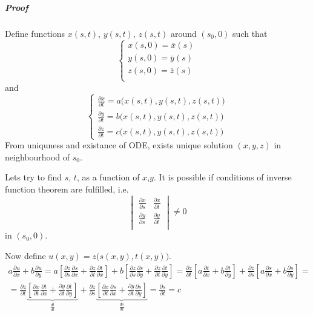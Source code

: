 \subparagraph{Proof}
Define functions $x(s,t)$, $y(s,t)$, $z(s,t)$ around $(s_0,0)$  such that
$$\begin{cases}
x(s,0) = \bar{x}(s)\\
y(s,0) = \bar{y}(s)\\
z(s,0) = \bar{z}(s)\\
\end{cases}$$
and
$$\begin{cases}
\frac{\partial x}{\partial t} = a\big(x(s,t), y(s,t), z(s,t)\big)\\
\frac{\partial y}{\partial t} = b\big(x(s,t), y(s,t), z(s,t)\big)\\
\frac{\partial z}{\partial t} = c\big(x(s,t), y(s,t), z(s,t)\big)
\end{cases}$$
From uniquness and existance of ODE, exists unique solution $(x,y,z)$ in neighbourhood of $s_0$.

Lets try to find $s$, $t$, as a function of $x$,$y$. It is possible if conditions of inverse function theorem are fulfilled, i.e.\
$$\begin{vmatrix}
\frac{\partial x}{\partial s}&\frac{\partial x}{\partial t}\\
\frac{\partial y}{\partial s}&\frac{\partial y}{\partial t}\\
\end{vmatrix}\neq 0$$
in $(s_0,0)$.

Now define $u(x,y) = z\big(s(x,y), t(x,y)\big)$.
\begin{align*}
a\frac{\partial u}{\partial x}+b\frac{\partial u}{\partial y} = a\left[\frac{\partial z}{\partial s}\frac{\partial s}{\partial x}+\frac{\partial z}{\partial t}\frac{\partial t}{\partial x}\right]+b\left[\frac{\partial z}{\partial s}\frac{\partial s}{\partial y}+\frac{\partial z}{\partial t}\frac{\partial t}{\partial y}\right] = \frac{\partial z}{\partial t} \left[a\frac{\partial t}{\partial x} + b\frac{\partial t}{\partial y}\right] + \frac{\partial z}{\partial s} \left[a\frac{\partial s}{\partial x} + b\frac{\partial s}{\partial y}\right] =\\= \frac{\partial z}{\partial t} \underbrace{\left[\frac{\partial x}{\partial t}\frac{\partial t}{\partial x} + \frac{\partial y}{\partial t}\frac{\partial t}{\partial y}\right]}_{\frac{dt}{dt}} + \frac{\partial z}{\partial s} \underbrace{ \left[\frac{\partial x}{\partial t}\frac{\partial s}{\partial x} + \frac{\partial y}{\partial t}\frac{\partial s}{\partial y}\right]}_{\frac{ds}{dt}} = \frac{\partial s}{\partial t} = c
\end{align*}
